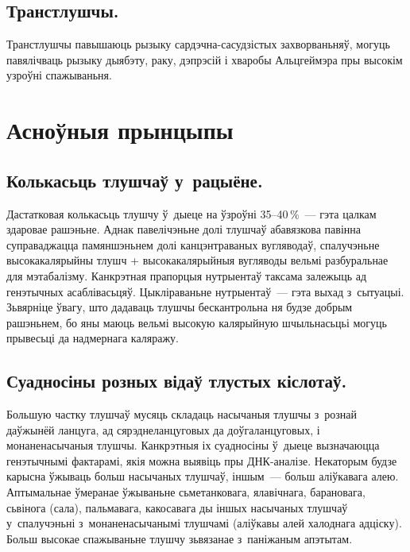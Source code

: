 \subsection{Транстлушчы.}
Транстлушчы павышаюць рызыку сардэчна-сасудзістых захворваньняў, могуць павялічваць рызыку дыябэту, раку, дэпрэсій і хваробы Альцгеймэра пры высокім узроўні спажываньня.

\section{Асноўныя прынцыпы}

\subsection{Колькасьць тлушчаў у~рацыёне.}
Дастатковая колькасьць тлушчу ў~дыеце на ўзроўні 35--40\,\%~--- гэта цалкам здаровае рашэньне. Аднак павелічэньне долі тлушчаў абавязкова павінна суправаджацца памяншэньнем долі канцэнтраваных вугляводаў, спалучэньне высокакалярыйны тлушч + высокакалярыйныя вугляводы вельмі разбуральнае для мэтабалізму. Канкрэтная прапорцыя нутрыентаў таксама залежыць ад генэтычных асаблівасьцяў. Цыкліраваньне нутрыентаў~--- гэта выхад з~сытуацыі. Зьвярніце ўвагу, што дадаваць тлушчы бескантрольна ня будзе добрым рашэньнем, бо яны маюць вельмі высокую калярыйную шчыльнасьцьі могуць прывесьці да надмернага каляражу.

\subsection{Суадносіны розных відаў тлустых кіслотаў.}
Большую частку тлушчаў мусяць складаць насычаныя тлушчы з~рознай даўжынёй ланцуга, ад сярэднеланцуговых да доўгаланцуговых, і монаненасычаныя тлушчы. Канкрэтныя іх суадносіны ў~дыеце вызначаюцца генэтычнымі фактарамі, якія можна выявіць пры ДНК-аналізе. Некаторым будзе карысна ўжываць больш насычаных тлушчаў, іншым~--- больш аліўкавага алею. Аптымальнае ўмеранае ўжываньне сьметанковага, ялавічнага, барановага, сьвінога (сала), пальмавага, какосавага ды іншых насычаных тлушчаў у~спалучэньні з~монаненасычанымі тлушчамі (аліўкавы алей халоднага адціску). Больш высокае спажываньне тлушчу зьвязанае з~паніжаным апэтытам.


